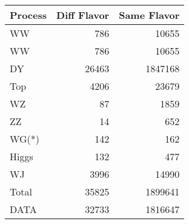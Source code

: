 \begin{table}[ht]
	\centering
\begin{tabular}{lrr}

Process &  Diff Flavor &  Same Flavor \\
		\hline
     WW &          786 &        10655 \\
     WW &          786 &        10655 \\
     DY &        26463 &      1847168 \\
    Top &         4206 &        23679 \\
     WZ &           87 &         1859 \\
     ZZ &           14 &          652 \\
  WG(*) &          142 &          162 \\
  Higgs &          132 &          477 \\
     WJ &         3996 &        14990 \\
\hline
  Total &        35825 &      1899641 \\
   DATA &        32733 &      1816647 \\


\end{tabular}

\end{table}